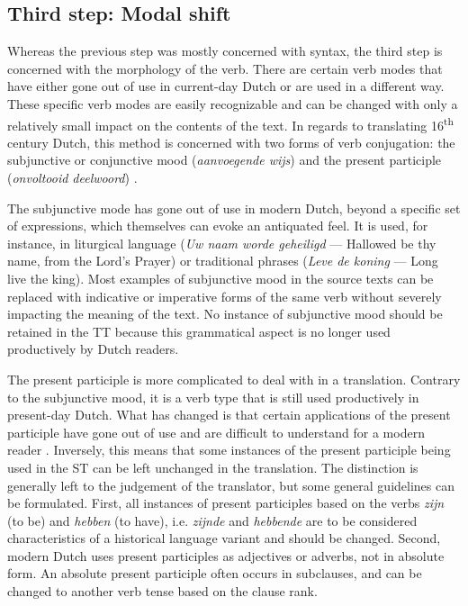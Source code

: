 \begin{paper}
\subsection{Third step: Modal shift}

Whereas the previous step was mostly concerned with syntax, the third
step is concerned with the morphology of the verb. There are certain
verb modes that have either gone out of use in current-day Dutch or are
used in a different way. These specific verb modes are easily
recognizable and can be changed with only a relatively small impact on
the contents of the text. In regards to translating 16\textsuperscript{th} century Dutch,
this method is concerned with two forms of verb conjugation: the
subjunctive or conjunctive mood (\emph{aanvoegende wijs}) and the
present participle (\emph{onvoltooid deelwoord}) \citep[308 and 321]{van_den_toorn_geschiedenis_1997}.

The subjunctive mode has gone out of use in modern Dutch, beyond a
specific set of expressions, which themselves can evoke an antiquated
feel. It is used, for instance, in liturgical language (\emph{Uw naam
{worde} geheiligd} --- Hallowed be thy name, from the Lord's Prayer) or
traditional phrases (\emph{{Leve} de koning} --- Long live the king). Most
examples of subjunctive mood in the source texts can be replaced with
indicative or imperative forms of the same verb without severely
impacting the meaning of the text. No instance of subjunctive mood
should be retained in the TT because this grammatical aspect is no
longer used productively by Dutch readers.

The present participle is more complicated to deal with in a
translation. Contrary to the subjunctive mood, it is a verb type that is
still used productively in present-day Dutch. What has changed is that
certain applications of the present participle have gone out of use and
are difficult to understand for a modern reader \citep[97--138]{duinhoven_deelwoorden_nodate}. Inversely, this means that some instances of the present
participle being used in the ST can be left unchanged in the
translation. The distinction is generally left to the judgement of the
translator, but some general guidelines can be formulated. First, all
instances of present participles based on the verbs \emph{zijn} (to be)
and \emph{hebben} (to have), i.e. \emph{zijnde} and \emph{hebbende} are
to be considered characteristics of a historical language variant and
should be changed. Second, modern Dutch uses present participles as
adjectives or adverbs, not in absolute form. An absolute present
participle often occurs in subclauses, and can be changed to another
verb tense based on the clause rank.


\end{paper}
